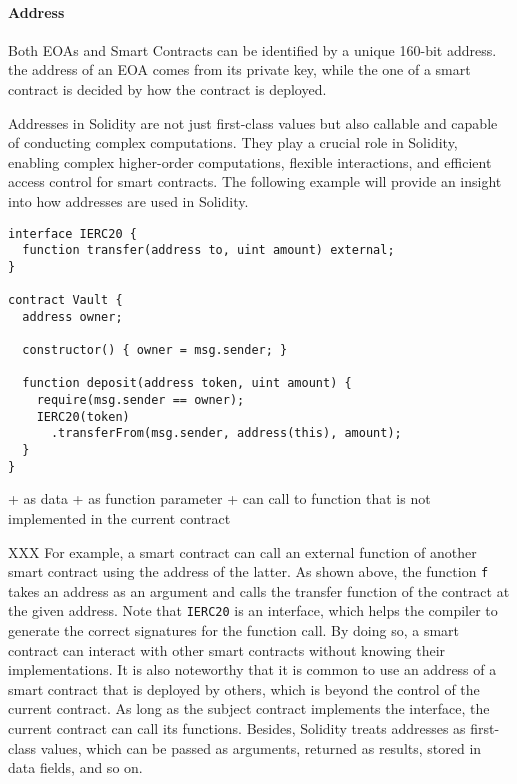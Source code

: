 \paragraph{Address}
Both EOAs and Smart Contracts can be identified by a unique 160-bit address. 
the address of an EOA comes from its private key, while the one of a smart contract is decided by how the contract is deployed. 

Addresses in Solidity are not just first-class values but also callable and capable of conducting complex computations. 
They play a crucial role in Solidity, enabling complex higher-order computations, flexible interactions, and efficient access control for smart contracts. 
The following example will provide an insight into how addresses are used in Solidity.

\begin{lstlisting}
interface IERC20 {
  function transfer(address to, uint amount) external;
}

contract Vault {
  address owner;
  
  constructor() { owner = msg.sender; }

  function deposit(address token, uint amount) {
    require(msg.sender == owner);
    IERC20(token)
      .transferFrom(msg.sender, address(this), amount);
  }
}
\end{lstlisting}


+ as data 
+ as function parameter
+ can call to function that is not implemented in the current contract

XXX For example, a smart contract can call an external function of another smart contract using the address of the latter.
As shown above, the function \texttt{f} takes an address as an argument and calls the transfer function of the contract at the given address. 
Note that \texttt{IERC20} is an interface, which helps the compiler to generate the correct signatures for the function call.
By doing so, a smart contract can interact with other smart contracts without knowing their implementations.
It is also noteworthy that it is common to use an address of a smart contract that is deployed by others, which is beyond the control of the current contract. 
As long as the subject contract implements the interface, the current contract can call its functions.
Besides, Solidity treats addresses as first-class values, which can be passed as arguments, returned as results, stored in data fields, and so on.


